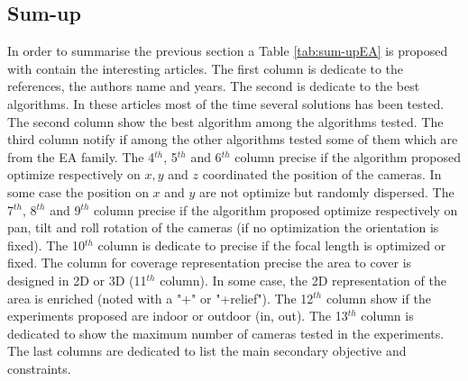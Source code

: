  \subsection{Sum-up} 
 In order to summarise the previous section a Table \ref{tab:sum-upEA} is proposed with contain the interesting articles.
 The first column  is dedicate to the references, the authors name  and years.
  The second is dedicate to  the best algorithms. In these articles most of the time several solutions has been tested. The second column show the best algorithm among the algorithms tested. The third column notify if among the other algorithms tested some of them which are from the EA  family. The 4$^{th}$,  5$^{th}$ and 6$^{th}$ column precise if the algorithm proposed optimize respectively on $x,y$ and $z$ coordinated the position of the cameras. In some case the position on $x$ and $y$ are not optimize  but randomly dispersed. The 7$^{th}$,  8$^{th}$ and 9$^{th}$ column precise if the algorithm proposed optimize respectively on pan, tilt and roll rotation of the cameras (if no optimization the orientation is fixed). The 10$^{th}$ column is dedicate to precise if the focal length is optimized or fixed. The column for coverage representation  precise the area to cover is designed in  2D or 3D (11$^{th}$ column). In some case, the 2D representation of the area is enriched (noted with a "+" or "+relief"). The 12$^{th}$  column show if the experiments proposed are indoor or outdoor (in, out). The 13$^{th}$  column is dedicated to show the maximum number of cameras tested in the experiments.  
 The last columns are  dedicated to list the main secondary objective and constraints. 
  
 
 
